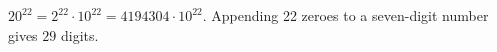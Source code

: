 $20^{22}=2^{22}\cdot10^{22}=4194304\cdot10^{22}$. Appending 22 zeroes to a seven-digit number gives $\boxed{29}$ digits.
